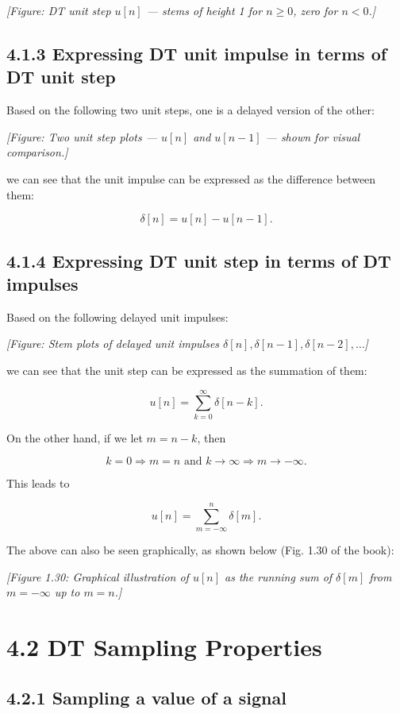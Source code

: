 \documentclass[11pt]{article}
\begin{document}
\textit{[Figure: DT unit step $u[n]$ — stems of height 1 for $n \geq 0$, zero for $n < 0$.]}

\subsection*{4.1.3 Expressing DT unit impulse in terms of DT unit step}

Based on the following two unit steps, one is a delayed version of the other:

\textit{[Figure: Two unit step plots — $u[n]$ and $u[n-1]$ — shown for visual comparison.]}

we can see that the unit impulse can be expressed as the difference between them:

\[\delta[n] = u[n] - u[n-1].\]

\subsection*{4.1.4 Expressing DT unit step in terms of DT impulses}

Based on the following delayed unit impulses:

\textit{[Figure: Stem plots of delayed unit impulses $\delta[n], \delta[n-1], \delta[n-2], \ldots$]}

we can see that the unit step can be expressed as the summation of them:

\[u[n] = \sum_{k=0}^{\infty} \delta[n-k].\]

On the other hand, if we let $m = n - k$, then

\[k = 0 \Rightarrow m = n \text{ and } k \to \infty \Rightarrow m \to -\infty.\]

This leads to

\[u[n] = \sum_{m=-\infty}^{n} \delta[m].\]

The above can also be seen graphically, as shown below (Fig. 1.30 of the book):

\textit{[Figure 1.30: Graphical illustration of $u[n]$ as the running sum of $\delta[m]$ from $m = -\infty$ up to $m = n$.]}

\section*{4.2 DT Sampling Properties}

\subsection*{4.2.1 Sampling a value of a signal}
\end{document}

